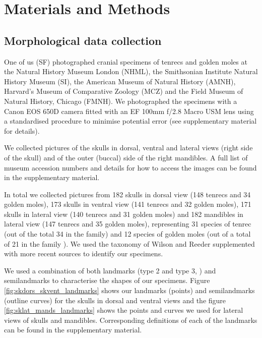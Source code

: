 \documentclass[12pt,a4paper]{article}
\begin{document}
\section{Materials and Methods}

\subsection{Morphological data collection} 

	
	One of us (SF) photographed cranial specimens of tenrecs and golden moles at the Natural History Museum London (NHML), the Smithsonian Institute Natural History Museum (SI), the American Museum of Natural History (AMNH), Harvard's Museum of Comparative Zoology (MCZ) and the Field Museum of Natural History, Chicago (FMNH). We photographed the specimens with a Canon EOS 650D camera fitted with an EF 100mm f/2.8 Macro USM lens using a standardised procedure to minimise potential error (see supplementary material for details). 

	We collected pictures of the skulls in dorsal, ventral and lateral views (right side of the skull) and of the outer (buccal) side of the right mandibles. A full list of museum accession numbers and details for how to access the images can be found in the supplementary material.

	In total we collected pictures from 182 skulls in dorsal view (148 tenrecs and 34 golden moles), 173 skulls in ventral view (141 tenrecs and 32 golden moles), 171 skulls in lateral view (140 tenrecs and 31 golden moles)   and 182 mandibles in lateral view (147 tenrecs and 35 golden moles), representing 31 species of tenrec (out of the total 34 in the family) and 12 species of golden moles (out of a total of 21 in the family \citep{Asher2010}). %
	We used the taxonomy of Wilson and Reeder \citeyearpar{Wilson2005} supplemented with more recent sources \citep{IUCN2012, Olson2013} to identify our specimens. 
	

	We used a combination of both landmarks (type 2 and type 3, \citep{Zelditch2012}) and semilandmarks to characterise the shapes of our specimens. Figure \ref{fig:skdors_skvent_landmarks} shows our landmarks (points) and semilandmarks (outline curves) for the skulls in dorsal and ventral views and the figure \ref{fig:sklat_mands_landmarks} shows the points and curves we used for lateral views of skulls and mandibles. Corresponding definitions of each of the landmarks can be found in the supplementary material.
	
\end{document}
